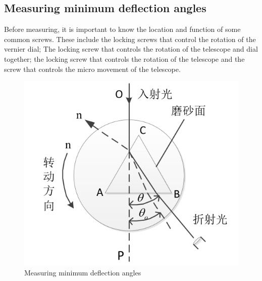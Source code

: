 \documentclass[UTF8]{article}
\begin{document}
    
    \subsection{Measuring minimum deflection angles}
   Before measuring, it is important to know the location and function of some common screws. These include the locking screws that control the rotation of the vernier dial; The locking screw that controls the rotation of the telescope and dial together; the locking screw that controls the rotation of the telescope and the screw that controls the micro movement of the telescope.
   \begin{figure}[H]
            	\centering
            	\includegraphics[clip,scale=0.8,trim={0 0 0 0}]{fig/fig17.png}
            	\caption{Measuring minimum deflection angles}
            	\label{figure.17}
            	\end{figure}
   
\end{document}
